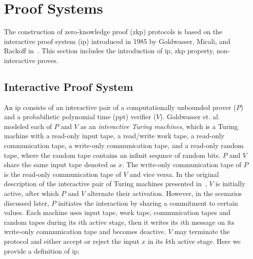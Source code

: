 \section{Proof Systems}

The construction of zero-knowledge proof (\gls{zkp}) protocols is based on the interactive proof system (\gls{ip}) introduced in 1985 by Goldwasser, Micali, and Rackoff in~\cite{Goldwasser1985}.  This section includes the introduction of \gls{ip}, \gls{zkp} property, non-interactive proves. 

\subsection{Interactive Proof System}\label{sec:Prel_IP}

 An \gls{ip} consists of  an interactive pair of a computationally unbounded prover ($P$) and a probabilistic polynomial time (\gls{ppt})  verifier ($V$).  Goldwasser et. al.~\cite{Goldwasser1985} modeled each of $P$ and $V$ as an \textit{interactive Turing machines}, which is a Turing machine with a read-only input tape, a read/write work tape, a read-only communication tape, a write-only communication tape, and a read-only random tape, where the random tape contains an infinit sequnce of random bits. $P$  and $V$ share the same input tape denoted as $x$. The write-only communication tape of $P$ is the read-only communication tape of $V$ and vice versa. In the original description of the interactive pair of Turing machines presented in~\cite{Goldwasser1985}, $V$ is initially active, after which $P$ and $V$ alternate their activation. However, in the scenarios discussed later, $P$ initiates the interaction by sharing a commitment to certain values. Each machine uses input tape, work tape, communication tapes and random tapes during its $i$th active stage, then it writes its $i$th message on its write-only communication tape and becomes deactive. $V$ may terminate the protocol and either accept or reject the input $x$ in its $k$th active stage. Here we provide a definition of \gls{ip}:
  
